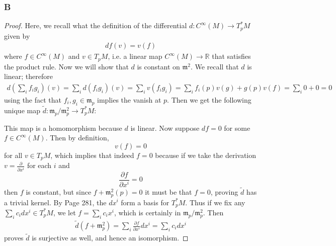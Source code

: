 \documentclass{article}
\newcommand{\R}{\mathbb{R}}
\newcommand{\frakm}{\mathfrak{m}}
\begin{document}
\subsubsection{B}\label{2.1.B}
\begin{proof}
    Here, we recall what the definition of the differential $d:C^\infty (M)\to T_p^*M$ given by
    \begin{align*}
        df(v)=v(f)
    \end{align*}
    where $f\in C^\infty (M)$ and $v\in T_p M$, i.e. a linear map $C^\infty(M)\to \R$ that satisfies the product rule. Now we will show that $d$ is constant on $\mathfrak{m}^2$. We recall that $d$ is linear; therefore
    \begin{align*}
        d(\sum_i f_ig_i)(v)=\sum_i d(f_ig_i)(v)=\sum_i v(f_ig_i)=\sum_i f_i(p) v(g)+g(p)v(f)=\sum_i 0+0=0
    \end{align*}
    using the fact that $f_i,g_i\in \frakm_p$ implies the vanish at $p$. Then we get the following unique map $\tilde d:\frakm_p/\frakm_p^2\to T^*_pM$:
    \begin{center}
    \end{center}
    This map is a homomorphism because $d$ is linear. Now suppose $df=0$ for some $f\in C^\infty(M)$. Then by definition,
    \[
    v(f)=0
    \]
    for all $v\in T_pM$, which implies that indeed $f=0$ because if we take the derivation $v=\frac{\partial}{\partial x^i}$ for each $i$ and 
    \[
    \frac{\partial f}{\partial x^i}=0
    \]
    then $f$ is constant, but since $f+\frakm_p^2(p)=0$ it must be that $f=0$, proving $\tilde d$ has a trivial kernel. By \cite{Lee_Manifolds} Page 281, the $dx^i$ form a basis for $T_p^*M$. Thus if we fix any $\sum_i c_i dx^i\in T_p^*M$, we let $f=\sum_i c_i x^i$, which is certainly in $\frakm_p/\frakm_p^2$. Then
    \begin{align*}
        \tilde d(f+\frakm_p^2)=\sum_i\frac{\partial f}{\partial x^i} dx^i=\sum_i c_i dx^i
    \end{align*}
    proves $\tilde d$ is surjective as well, and hence an isomorphism.
\end{proof}
\subsection{}
\end{document}
